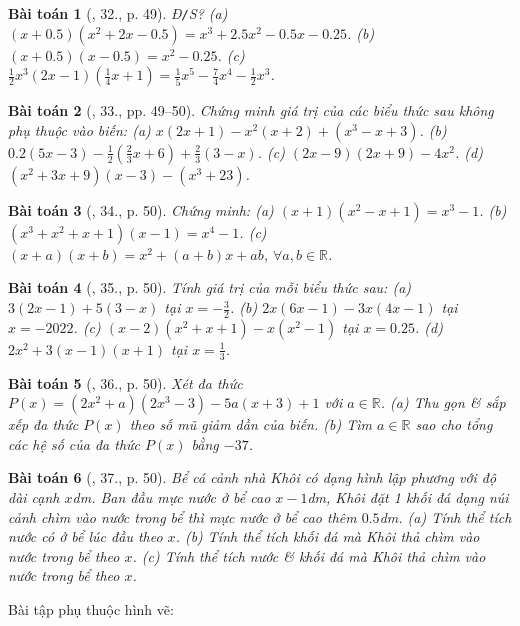 \documentclass{article}
\newtheorem{baitoan}{Bài toán}
\begin{document}
\begin{baitoan}[\cite{SBT_Toan_7_Canh_Dieu_tap_2}, 32., p. 49]
	\emph{Đ\texttt{/}S?} (a) $(x + 0.5)(x^2 + 2x - 0.5) = x^3 + 2.5x^2 - 0.5x - 0.25$. (b) $(x + 0.5)(x - 0.5) = x^2  - 0.25$. (c) $\frac{1}{2}x^3(2x - 1)\left(\frac{1}{4}x + 1\right) = \frac{1}{5}x^5 - \frac{7}{4}x^4 - \frac{1}{2}x^3$.
\end{baitoan}

\begin{baitoan}[\cite{SBT_Toan_7_Canh_Dieu_tap_2}, 33., pp. 49--50]
	Chứng minh giá trị của các biểu thức sau không phụ thuộc vào biến: (a) $x(2x + 1) - x^2(x + 2) + (x^3 - x + 3)$. (b) $0.2(5x - 3) - \frac{1}{2}\left(\frac{2}{3}x + 6\right) + \frac{2}{3}(3 - x)$. (c) $(2x - 9)(2x + 9) - 4x^2$. (d) $(x^2 + 3x + 9)(x - 3) - (x^3 + 23)$.
\end{baitoan}

\begin{baitoan}[\cite{SBT_Toan_7_Canh_Dieu_tap_2}, 34., p. 50]
	Chứng minh: (a) $(x + 1)(x^2 - x + 1) = x^3 - 1$. (b) $(x^3 + x^2 + x + 1)(x - 1) = x^4 - 1$. (c) $(x + a)(x + b) = x^2 + (a + b)x + ab$, $\forall a,b\in\mathbb{R}$.
\end{baitoan}

\begin{baitoan}[\cite{SBT_Toan_7_Canh_Dieu_tap_2}, 35., p. 50]
	Tính giá trị của mỗi biểu thức sau: (a) $3(2x - 1) + 5(3 - x)$ tại $x = -\frac{3}{2}$. (b) $2x(6x - 1) - 3x(4x - 1)$ tại $x = -2022$. (c) $(x - 2)(x^2 + x + 1) - x(x^2 - 1)$ tại $x = 0.25$. (d) $2x^2 + 3(x - 1)(x + 1)$ tại $x = \frac{1}{3}$.
\end{baitoan}

\begin{baitoan}[\cite{SBT_Toan_7_Canh_Dieu_tap_2}, 36., p. 50]
	Xét đa thức $P(x) = (2x^2 + a)(2x^3 - 3) - 5a(x + 3) + 1$ với $a\in\mathbb{R}$. (a) Thu gọn \& sắp xếp đa thức $P(x)$ theo số mũ giảm dần của biến. (b) Tìm $a\in\mathbb{R}$ sao cho tổng các hệ số của đa thức $P(x)$ bằng $-37$.
\end{baitoan}

\begin{baitoan}[\cite{SBT_Toan_7_Canh_Dieu_tap_2}, 37., p. 50]
	Bể cá cảnh nhà Khôi có dạng hình lập phương với độ dài cạnh $x$\emph{dm}. Ban đầu mực nước ở bể cao $x - 1$\emph{dm}, Khôi đặt 1 khối đá dạng núi cảnh chìm vào nước trong bể thì mực nước ở bể cao thêm $0.5$\emph{dm}. (a) Tính thể tích nước có ở bể lúc đầu theo $x$. (b) Tính thể tích khối đá mà Khôi thả chìm vào nước trong bể theo $x$. (c) Tính thể tích nước \& khối đá mà Khôi thả chìm vào nước trong bể theo $x$.
\end{baitoan}
Bài tập phụ thuộc hình vẽ: \cite[38., p. 50]{SBT_Toan_7_Canh_Dieu_tap_2}
\end{document}
